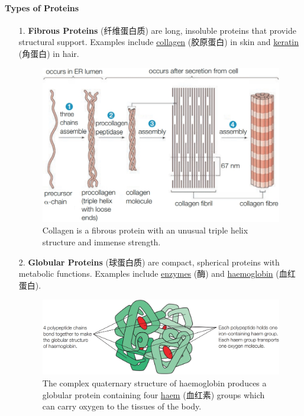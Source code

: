 \paragraph{Types of Proteins}
\begin{itemize}
    \item[1.] \textbf{Fibrous Proteins} (纤维蛋白质) are long, insoluble proteins that provide structural support. Examples include
    \underline{collagen} (胶原蛋白) in skin and \underline{keratin} (角蛋白) in hair.
    \begin{figure}[H]
        \centering
        \includegraphics[scale=0.3]{Biology/1A/Images/1A-5-5.png}
        \caption{Collagen is a fibrous protein with an unusual triple helix structure and immense strength.}
    \end{figure}
    \item[2.] \textbf{Globular Proteins} (球蛋白质) are compact, spherical proteins with metabolic functions. Examples include
    \underline{enzymes} (酶) and \underline{haemoglobin} (血红蛋白).
    \begin{figure}[H]
        \centering
        \includegraphics[scale=0.3]{Biology/1A/Images/1A-5-6.png}
        \caption{The complex quaternary structure of haemoglobin produces a globular protein containing four \underline{haem}
        (血红素) groups which can carry oxygen to the tissues of the body.}
    \end{figure}
\end{itemize}

